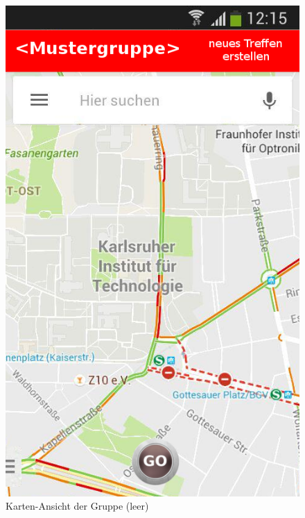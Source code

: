 \begin{figure}
	\caption{Karten-Ansicht der Gruppe (leer)}
	\includegraphics[scale =0.5]{resources/images/map_leer_Admin.png}
\end{figure}

